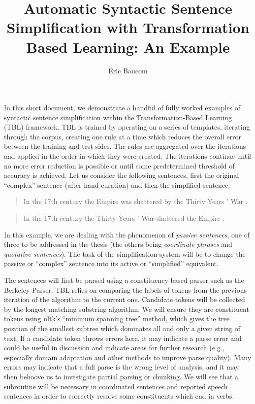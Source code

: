 \documentclass{article}
\begin{document}
\author{Eric Baucom}
\title{Automatic Syntactic Sentence Simplification with Transformation Based Learning: An Example}
\maketitle

In this short document, we demonstrate a handful of fully worked examples of syntactic sentence simplification within the Transformation-Based Learning (TBL) framework. TBL is trained by operating on a series of templates, iterating through the corpus, creating one rule at a time which reduces the overall error between the training and test sides. The rules are aggregated over the iterations and applied in the order in which they were created. The iterations continue until no more error reduction is possible or until some predetermined threshold of accuracy is achieved. Let us consider the following sentences, first the original ``complex'' sentence (after hand-curation) and then the simplified sentence:

\begin{quote}
In the 17th century the Empire was shattered by the Thirty Years ' War .
\end{quote}

\begin{quote}
In the 17th century the Thirty Years ' War shattered the Empire .
\end{quote}

In this example, we are dealing with the phenomenon of \textit{passive sentences}, one of three to be addressed in the thesis (the others being \textit{coordinate phrases} and \textit{quotative sentences}). The task of the simplification system will be to change the passive or ``complex'' sentence into its active or ``simplified'' equivalent.

The sentences will first be parsed using a constituency-based parser such as the Berkeley Parser. TBL relies on comparing the labels of tokens from the previous iteration of the algorithm to the current one. Candidate tokens will be collected by the longest matching substring algorithm. We will ensure they are
constituent tokens using nltk's ``minimum spanning tree'' method, which gives the
tree position of the smallest subtree which dominates all and only a given
string of text. If a candidate token throws errors here, it may
indicate a parse error and could be useful in discussion and indicate
areas for further research (e.g., especially domain adaptation and other methods to improve parse quality). Many errors may indicate that a full
parse is the wrong level of analysis, and it may then behoove us to investigate partial parsing or chunking. We will see that a subroutine will be necessary in coordinated sentences and reported speech sentences in order to correctly resolve some constituents which end in verbs.
\end{document}
